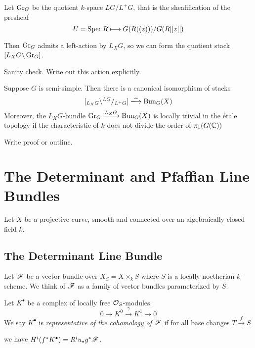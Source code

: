 \documentclass[12pt]{article}
\begin{document}
\begin{defn}
    Let $\operatorname{Gr}_G$ be the quotient $k$-space $LG/L^+G$, that is the sheafification of the presheaf
\[U = \operatorname{Spec} R \longmapsto G(R((z)))/G(R[[z]])\]
\end{defn}

Then $\operatorname{Gr}_G$ admits a left-action by $L_X G$, so we can form the quotient stack $[L_X G \backslash \operatorname{Gr}_G ]$. 
\begin{todo}
    Sanity check. Write out this action explicitly.
\end{todo}
\begin{thm}[Uniformization] Suppose $G$ is semi-simple. Then there is a canonical isomorphism of stacks
\[[_{L_X G}\backslash^{LG}/_{L^+ G}] \xlongrightarrow{\sim} \Bun_G(X)\]
    Moreover, the $L_X G$-bundle $\operatorname{Gr}_G \xrightarrow{L_X G} \operatorname{Bun}_G(X)$ is locally trivial in the \'etale topology if the characteristic of $k$ does not divide the order of $\pi_1(G(\mathbb{C}))$
\end{thm}

\begin{todo}
    Write proof or outline.
\end{todo}

\section{The Determinant and Pfaffian Line Bundles}

Let $X$ be a projective curve, smooth and connected over an algebraically closed field $k$.

\subsection{The Determinant Line Bundle}

Let $\mathscr{F}$ be a vector bundle over $X_S = X \times_k S$ where $S$ is a locally noetherian $k$-scheme. We think of $\mathscr{F}$ as a family of vector bundles parameterized by $S$.

\begin{defn}
    Let $K^{\bullet}$ be a complex of locally free $\mathcal{O}_S$-modules.
    \[0 \to K^0 \xrightarrow{\gamma} K^1 \to 0\]
    We say $K^{\bullet}$ is \textit{representative of the cohomology of $\mathscr{F}$} if for all base changes $T \xrightarrow{f} S$
    \begin{figure}[H]
        \centering
    \end{figure}
    we have $H^i(f^* K^{\bullet}) = R^i u_* g^* \mathscr{F}$.
\end{defn}
\end{document}
